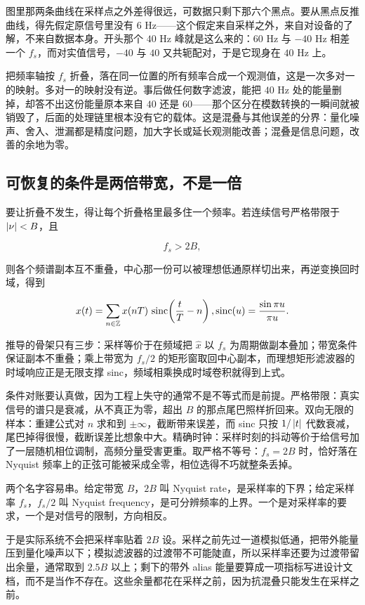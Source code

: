 图里那两条曲线在采样点之外差得很远，可数据只剩下那六个黑点。要从黑点反推曲线，得先假定原信号里没有 \(6\) Hz——这个假定来自采样之外，来自对设备的了解，不来自数据本身。开头那个 \(40\) Hz 峰就是这么来的：\(60\) Hz 与 \(-40\) Hz 相差一个 \(f_s\)，而对实值信号，\(-40\) 与 \(40\) 又共轭配对，于是它现身在 \(40\) Hz 上。

把频率轴按 \(f_s\) 折叠，落在同一位置的所有频率合成一个观测值，这是一次多对一的映射。多对一的映射没有逆。事后做任何数字滤波，能把 \(40\) Hz 处的能量删掉，却答不出这份能量原本来自 \(40\) 还是 \(60\)——那个区分在模数转换的一瞬间就被销毁了，后面的处理链里根本没有它的载体。这是混叠与其他误差的分界：量化噪声、舍入、泄漏都是精度问题，加大字长或延长观测能改善；混叠是信息问题，改善的余地为零。

\subsection{可恢复的条件是两倍带宽，不是一倍}

要让折叠不发生，得让每个折叠格里最多住一个频率。若连续信号严格带限于 \(\left|\nu\right|<B\)，且

\[
f_s>2B,
\]

则各个频谱副本互不重叠，中心那一份可以被理想低通原样切出来，再逆变换回时域，得到

\[
x(t)=\sum_{n\in\mathbb{Z}}x(nT)\,\operatorname{sinc}\!\left(\frac{t}{T}-n\right),
\space
\operatorname{sinc}(u)=\frac{\sin \pi u}{\pi u}.
\]

推导的骨架只有三步：采样等价于在频域把 \(\hat x\) 以 \(f_s\) 为周期做副本叠加；带宽条件保证副本不重叠；乘上带宽为 \(f_s/2\) 的矩形窗取回中心副本，而理想矩形滤波器的时域响应正是无限支撑 sinc，频域相乘换成时域卷积就得到上式。

条件对账要认真做，因为工程上失守的通常不是不等式而是前提。严格带限：真实信号的谱只是衰减，从不真正为零，超出 \(B\) 的那点尾巴照样折回来。双向无限的样本：重建公式对 \(n\) 求和到 \(\pm\infty\)，截断带来误差，而 sinc 只按 \(1/\left|t\right|\) 代数衰减，尾巴掉得很慢，截断误差比想象中大。精确时钟：采样时刻的抖动等价于给信号加了一层随机相位调制，高频分量受害更重。取严格不等号：\(f_s=2B\) 时，恰好落在 Nyquist 频率上的正弦可能被采成全零，相位选得不巧就整条丢掉。

两个名字容易串。给定带宽 \(B\)，\(2B\) 叫 Nyquist rate，是采样率的下界；给定采样率 \(f_s\)，\(f_s/2\) 叫 Nyquist frequency，是可分辨频率的上界。一个是对采样率的要求，一个是对信号的限制，方向相反。

于是实际系统不会把采样率贴着 \(2B\) 设。采样之前先过一道模拟低通，把带外能量压到量化噪声以下；模拟滤波器的过渡带不可能陡直，所以采样率还要为过渡带留出余量，通常取到 \(2.5B\) 以上；剩下的带外 alias 能量要算成一项指标写进设计文档，而不是当作不存在。这些余量都花在采样之前，因为抗混叠只能发生在采样之前。

